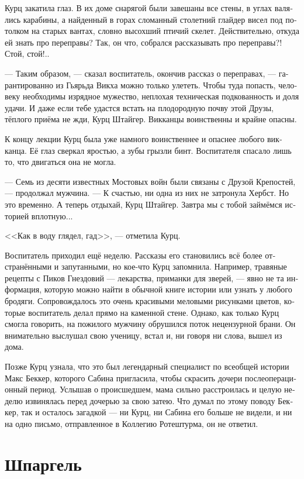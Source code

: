 \documentclass[a4paper,12pt,fleqn]{book}\usepackage{cooltooltips}\usepackage{polyglossia}\setdefaultlanguage[babelshorthands=true]{russian}\setotherlanguage{english}\defaultfontfeatures{Ligatures=TeX,Mapping=tex-text} \usepackage{xcolor}\definecolor{lightgray}{HTML}{bbbbbb}\color{lightgray}\newcommand{\ml}[3]{\textenglish{\textcolor{black}{#3}}}
\begin{document}
Курц закатила глаз.
В их доме снарягой были завешаны все стены, в углах валялись карабины, а найденный в горах сломанный столетний глайдер висел под потолком на старых вантах, словно высохший птичий скелет.
Действительно, откуда ей знать про переправы?
Так, он что, собрался рассказывать про переправы?!
Стой, стой!..

--- Таким образом, --- сказал воспитатель, окончив рассказ о переправах, --- гарантированно из Гьярьда Викха можно только улететь.
Чтобы туда попасть, человеку необходимы изрядное мужество, неплохая техническая подкованность и доля удачи.
И даже если тебе удастся встать на плодородную почву этой Друзы, тёплого приёма не жди, Курц Штайгер.
Викканцы воинственны и крайне опасны.

К концу лекции Курц была уже намного воинственнее и опаснее любого викканца.
Её глаз сверкал яростью, а зубы грызли бинт.
Воспитателя спасало лишь то, что двигаться она не могла.

--- Семь из десяти известных Мостовых войн были связаны с Друзой Крепостей, --- продолжал мужчина.
--- К счастью, ни одна из них не затронула Хербст.
Но это временно.
А теперь отдыхай, Курц Штайгер.
Завтра мы с тобой займёмся историей вплотную...

<<Как в воду глядел, гад>>, --- отметила Курц.

Воспитатель приходил ещё неделю.
Рассказы его становились всё более отстранёнными и запутанными, но кое-что Курц запомнила.
Например, травяные рецепты с Пиков Гнездовий --- лекарства, приманки для зверей, --- явно не та информация, которую можно найти в обычной книге истории или узнать у любого бродяги.
Сопровождалось это очень красивыми меловыми рисунками цветов, которые воспитатель делал прямо на каменной стене.
Однако, как только Курц смогла говорить, на пожилого мужчину обрушился поток нецензурной брани.
Он внимательно выслушал свою ученицу, встал и, ни говоря ни слова, вышел из дома.

Позже Курц узнала, что это был легендарный специалист по всеобщей истории Макс Беккер, которого Сабина пригласила, чтобы скрасить дочери послеоперационный период.
Услышав о происшедшем, мама сильно расстроилась и целую неделю извинялась перед дочерью за свою затею.
Что думал по этому поводу Беккер, так и осталось загадкой --- ни Курц, ни Сабина его больше не видели, и ни на одно письмо, отправленное в Коллегию Ротештурма, он не ответил.

\section{Шпаргель}
\end{document}
